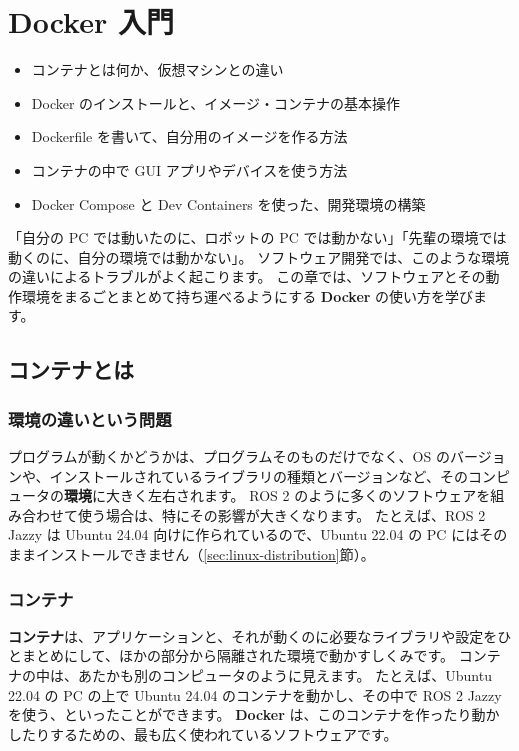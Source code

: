 \chapter{Docker 入門}
\label{chap:docker}

\begin{goalbox}
  \begin{itemize}
    \item コンテナとは何か、仮想マシンとの違い
    \item Docker のインストールと、イメージ・コンテナの基本操作
    \item Dockerfile を書いて、自分用のイメージを作る方法
    \item コンテナの中で GUI アプリやデバイスを使う方法
    \item Docker Compose と Dev Containers を使った、開発環境の構築
  \end{itemize}
\end{goalbox}

「自分の PC では動いたのに、ロボットの PC では動かない」「先輩の環境では動くのに、自分の環境では動かない」。
ソフトウェア開発では、このような環境の違いによるトラブルがよく起こります。
この章では、ソフトウェアとその動作環境をまるごとまとめて持ち運べるようにする \textbf{Docker} の使い方を学びます。

\section{コンテナとは}
\label{sec:docker-container}

\subsection{環境の違いという問題}

プログラムが動くかどうかは、プログラムそのものだけでなく、OS のバージョンや、インストールされているライブラリの種類とバージョンなど、そのコンピュータの\textbf{環境}に大きく左右されます。
ROS 2 のように多くのソフトウェアを組み合わせて使う場合は、特にその影響が大きくなります。
たとえば、ROS 2 Jazzy は Ubuntu 24.04 向けに作られているので、Ubuntu 22.04 の PC にはそのままインストールできません（\ref{sec:linux-distribution}節）。

\subsection{コンテナ}

\textbf{コンテナ}は、アプリケーションと、それが動くのに必要なライブラリや設定をひとまとめにして、ほかの部分から隔離された環境で動かすしくみです。
コンテナの中は、あたかも別のコンピュータのように見えます。
たとえば、Ubuntu 22.04 の PC の上で Ubuntu 24.04 のコンテナを動かし、その中で ROS 2 Jazzy を使う、といったことができます。
\textbf{Docker} は、このコンテナを作ったり動かしたりするための、最も広く使われているソフトウェアです。

